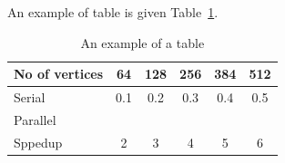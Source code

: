 	An example of table is given Table~\ref{tab:example}.
	\begin{table}[!htb]
		\centering
		\caption{An example of a table}\label{tab:example}
		\begin{tabular}{l|ccccc}
			\toprule
			No of vertices & 64 & 128 & 256 & 384 & 512\\
			\midrule
			Serial &0.1&0.2&0.3&0.4&0.5\\
			Parallel &&&&\\
			Sppedup &2&3&4&5&6\\
			\bottomrule
		\end{tabular}
	\end{table} 
	
	\newpage
	
	
 

